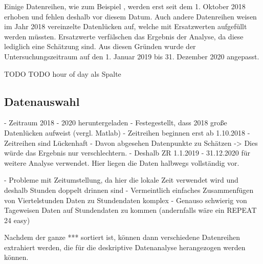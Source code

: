 Einige Datenreihen, wie zum Beispiel , werden erst seit dem 1. Oktober 2018 erhoben und fehlen deshalb vor diesem Datum. Auch andere Datenreihen weisen im Jahr 2018 vereinzelte Datenlücken auf, welche mit Ersatzwerten aufgefüllt werden müssten. Ersatzwerte verfälschen das Ergebnis der Analyse, da diese lediglich eine Schätzung sind. Aus diesen Gründen wurde der Untersuchungszeitraum auf den 1. Januar 2019 bis 31. Dezember 2020 angepasst.

TODO
TODO hour of day als Spalte

\subsection{Datenauswahl}


- Zeitraum 2018 - 2020 heruntergeladen
- Festegestellt, dass 2018 große Datenlücken aufweist (vergl. Matlab)
  - Zeitreihen beginnen erst ab 1.10.2018
  - Zeitreihen sind Lückenhaft
- Davon abgesehen Datenpunkte zu Schätzen -> Dies würde das Ergebnis nur verschlechtern.
- Deshalb ZR 1.1.2019 - 31.12.2020 für weitere Analyse verwendet. Hier liegen die Daten halbwegs vollständig vor.

- Probleme mit Zeitumstellung, da hier die lokale Zeit verwendet wird und deshalb Stunden doppelt drinnen sind
  - Vermeintlich einfaches Zusammenfügen von Viertelstunden Daten zu Stundendaten komplex
  - Genauso schwierig von Tageweisen Daten auf Stundendaten zu kommen (andernfalls wäre ein REPEAT 24 easy)

Nachdem der ganze *** sortiert ist, können dann verschiedene Datenreihen extrahiert werden, die für die deskriptive Datenanalyse herangezogen werden können. 
